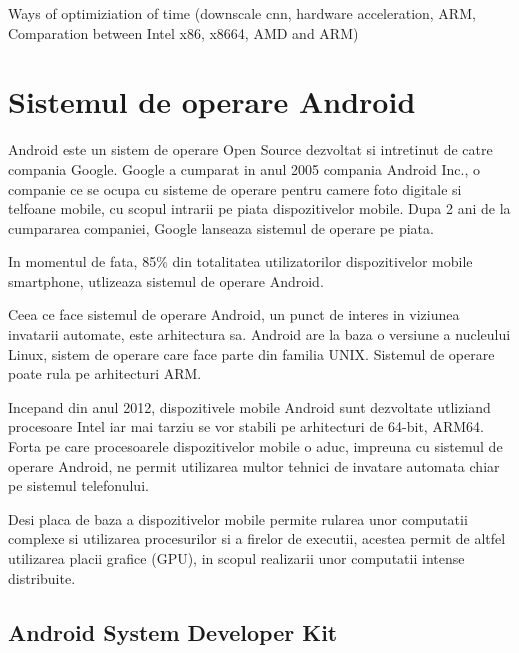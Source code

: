 	 Ways of optimiziation of time (downscale cnn, hardware acceleration, ARM, Comparation between Intel x86, x8664, AMD and ARM)
	
	\section{Sistemul de operare Android}
	
	Android este un sistem de operare Open Source dezvoltat si intretinut de catre compania Google. Google a cumparat in anul 2005 compania Android Inc., o companie ce se ocupa cu sisteme de operare pentru camere foto digitale si telfoane mobile, cu scopul intrarii pe piata dispozitivelor mobile. Dupa 2 ani de la cumpararea companiei, Google lanseaza sistemul de operare pe piata. 
	
	In momentul de fata, 85\% din totalitatea utilizatorilor dispozitivelor mobile smartphone, utlizeaza sistemul de operare Android. 
	
	Ceea ce face sistemul de operare Android, un punct de interes in viziunea invatarii automate, este arhitectura sa. Android are la baza o versiune a nucleului Linux, sistem de operare care face parte din familia UNIX. Sistemul de operare poate rula pe arhitecturi ARM. 
	
	Incepand din anul 2012, dispozitivele mobile Android sunt dezvoltate utliziand procesoare Intel iar mai tarziu se vor stabili pe arhitecturi de 64-bit, ARM64. 
	Forta pe care procesoarele dispozitivelor mobile o aduc, impreuna cu sistemul de operare Android, ne permit utilizarea multor tehnici de invatare automata chiar pe sistemul telefonului. 
	
	Desi placa de baza a dispozitivelor mobile permite rularea unor computatii complexe si utilizarea procesurilor si a firelor de executii, acestea permit de altfel utilizarea placii grafice (GPU), in scopul realizarii unor computatii intense distribuite.
	
	\subsection{Android System Developer Kit}
	
